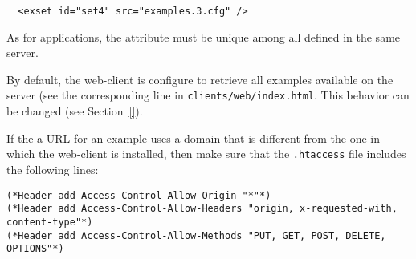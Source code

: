 \medskip
\begin{lstlisting}
  <exset id="set4" src="examples.3.cfg" />
\end{lstlisting}

\medskip
\indent
As for applications, the  attribute must be unique among all
 defined in the same server.

By default, the web-client is configure to retrieve all examples
available on the server (see the corresponding line in
\texttt{clients/web/index.html}. This behavior can be changed (see
Section~\ref{}).

If the a URL for an example uses a domain that is different from the
one in which the web-client is installed, then make sure that the
\texttt{.htaccess} file includes the following lines:

\begin{lstlisting}
(*Header add Access-Control-Allow-Origin "*"*)
(*Header add Access-Control-Allow-Headers "origin, x-requested-with, content-type"*)
(*Header add Access-Control-Allow-Methods "PUT, GET, POST, DELETE, OPTIONS"*)
\end{lstlisting}
